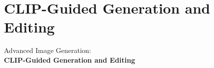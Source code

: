 \section{CLIP-Guided Generation and Editing}
\begin{frame}{}
    \LARGE Advanced Image Generation: \\[1ex] \textbf{CLIP-Guided Generation and Editing}
\end{frame}





